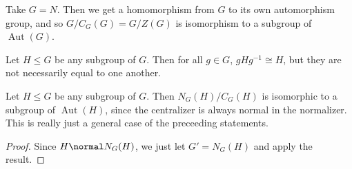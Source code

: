 \begin{corollary}
Take $G = N$. Then we get a homomorphism from $G$ to its own automorphism group, and so $G/C_G(G) = G/Z(G)$ is isomorphism to a subgroup of $\operatorname{Aut}(G)$.
\end{corollary}

\begin{corollary}
Let $H \leq G$ be any subgroup of $G$. Then for all $g \in G$, $gHg^{-1} \cong H$, but they are not necessarily equal to one another.
\end{corollary}

\begin{corollary}
Let $H \leq G$ be any subgroup of $G$. Then $N_G(H) / C_G(H)$ is isomorphic to a subgroup of $\operatorname{Aut}(H)$, since the centralizer is always normal in the normalizer. This is really just a general case of the preceeding statements.
\end{corollary}

\begin{proof}
Since $H \normal N_G(H)$, we just let $G' = N_G(H)$ and apply the result.
\end{proof}